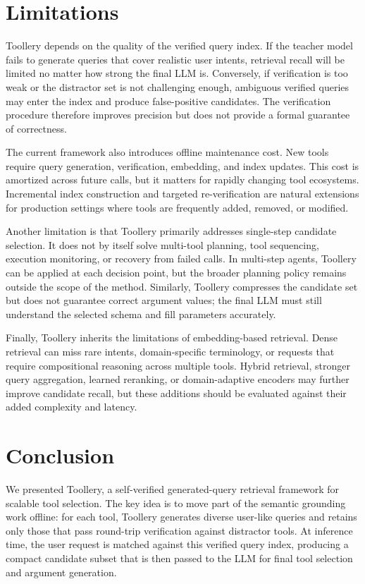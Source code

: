 \section{Limitations}
\label{sec:limitations_draft}

Toollery depends on the quality of the verified query index. If the teacher model fails to generate queries that cover realistic user intents, retrieval recall will be limited no matter how strong the final LLM is. Conversely, if verification is too weak or the distractor set is not challenging enough, ambiguous verified queries may enter the index and produce false-positive candidates. The verification procedure therefore improves precision but does not provide a formal guarantee of correctness.

The current framework also introduces offline maintenance cost. New tools require query generation, verification, embedding, and index updates. This cost is amortized across future calls, but it matters for rapidly changing tool ecosystems. Incremental index construction and targeted re-verification are natural extensions for production settings where tools are frequently added, removed, or modified.

Another limitation is that Toollery primarily addresses single-step candidate selection. It does not by itself solve multi-tool planning, tool sequencing, execution monitoring, or recovery from failed calls. In multi-step agents, Toollery can be applied at each decision point, but the broader planning policy remains outside the scope of the method. Similarly, Toollery compresses the candidate set but does not guarantee correct argument values; the final LLM must still understand the selected schema and fill parameters accurately.

Finally, Toollery inherits the limitations of embedding-based retrieval. Dense retrieval can miss rare intents, domain-specific terminology, or requests that require compositional reasoning across multiple tools. Hybrid retrieval, stronger query aggregation, learned reranking, or domain-adaptive encoders may further improve candidate recall, but these additions should be evaluated against their added complexity and latency.

\section{Conclusion}
\label{sec:conclusion_draft}

We presented Toollery, a self-verified generated-query retrieval framework for scalable tool selection. The key idea is to move part of the semantic grounding work offline: for each tool, Toollery generates diverse user-like queries and retains only those that pass round-trip verification against distractor tools. At inference time, the user request is matched against this verified query index, producing a compact candidate subset that is then passed to the LLM for final tool selection and argument generation.

